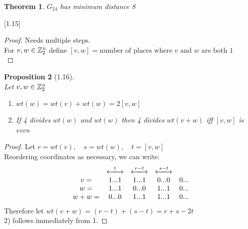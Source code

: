 \documentclass[]{article}
\newtheorem{thm}{Theorem}[section]
\newtheorem{prop}[thm]{Proposition}
\theoremstyle{definition}
\theoremstyle{remark}
\numberwithin{equation}{section}
\begin{document}
		\begin{thm}
			$G_24$ has minimum distance 8\\
		\end{thm}[1.15]
		\begin{proof}
			Needs multiple steps. \\
			For $v,w \in \mathbb{Z}_2^n$ define $[v,w] = \text{number of places where $v$ and $w$ are both 1}$\\
		\end{proof}
		\begin{prop}[1.16]\hfill\\
			Let $v,w \in \mathbb{Z}_2^n$\\
			\begin{enumerate}
				\item $wt(w) = wt(v) + wt(w) = 2[v,w]$\\
				\item If 4 divides $wt(w)$ and $wt(w)$ then 4 divides $wt(v+w)$ iff $[v,w]$ is even\\
			\end{enumerate}
		\end{prop}
		\begin{proof}
			Let $r = wt(v),\quad s = wt(w),\quad t = [v,w]$\\
			Reordering coordinates as necessary, we can write:\\
			\[
				\begin{matrix}
					& \xlongleftrightarrow{t} & \xlongleftrightarrow{r-t} & \xlongleftrightarrow{s-t}\\
				v  =& 1 ... 1  				  &1 ... 1 					  &0 ...0		    & 0 ... \\
				w  =& 1 ... 1  				  &0 ... 0 					  &1 ...1		    & 0 ... \\
				w+w=& 0 ... 0  				  &1 ... 1 					  &1 ...1		    & 0 ... \\
				\end{matrix}
			\]
			Therefore let $wt(v+w) = (r-t) + (s-t) = r +s - 2t$\\
			2) follows immediately from 1.
		\end{proof}
\end{document}
